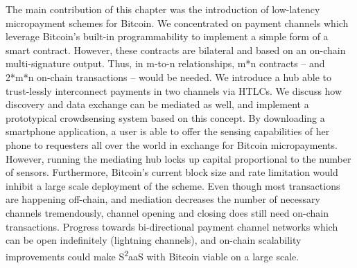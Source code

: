 The main contribution of this chapter was the introduction of low-latency micropayment schemes for Bitcoin. We concentrated on payment channels which leverage Bitcoin's built-in programmability to implement a simple form of a smart contract. However, these contracts are bilateral and based on an on-chain multi-signature output. Thus, in m-to-n relationships, m*n contracts -- and 2*m*n on-chain transactions -- would be needed. We introduce a hub able to trust-lessly interconnect payments in two channels via \ac{HTLC}s. We discuss how discovery and data exchange can be mediated as well, and implement a prototypical crowdsensing system based on this concept. By downloading a smartphone application, a user is able to offer the sensing capabilities of her phone to requesters all over the world in exchange for Bitcoin micropayments. However, running the mediating hub locks up capital proportional to the number of sensors. Furthermore, Bitcoin's current block size and rate limitation would inhibit a large scale deployment of the scheme. Even though most transactions are happening off-chain, and mediation decreases the number of necessary channels tremendously, channel opening and closing does still need on-chain transactions. Progress towards bi-directional payment channel networks which can be open indefinitely (lightning channels), and on-chain scalability improvements could make S\textsuperscript{2}aaS with Bitcoin viable on a large scale. 




